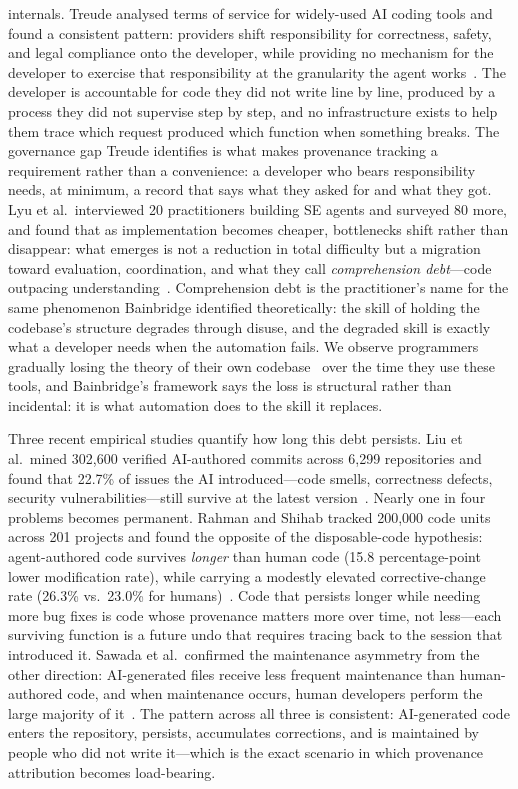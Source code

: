 internals.
Treude analysed terms of service for widely-used AI coding tools and found a
consistent pattern: providers shift responsibility for correctness, safety, and
legal compliance onto the developer, while providing no mechanism for the
developer to exercise that responsibility at the granularity the agent
works~\cite{treude2026accountable}. The developer is accountable for code they
did not write line by line, produced by a process they did not supervise step by
step, and no infrastructure exists to help them trace which request produced which
function when something breaks. The governance gap Treude identifies is what makes
provenance tracking a requirement rather than a convenience: a developer who bears
responsibility needs, at minimum, a record that says what they asked for and what
they got.
Lyu et al.\ interviewed 20 practitioners building SE agents and surveyed 80 more,
and found that as implementation becomes cheaper, bottlenecks shift rather than
disappear: what emerges is not a reduction in total difficulty but a migration
toward evaluation, coordination, and what they call \emph{comprehension
debt}---code outpacing understanding~\cite{lyu2026practitioners}. Comprehension
debt is the practitioner's name for the same phenomenon Bainbridge identified
theoretically: the skill of holding the codebase's structure degrades through
disuse, and the degraded skill is exactly what a developer needs when the
automation fails. We observe programmers gradually losing the theory of
their own codebase~\cite{naur1985} over the time they use these tools, and
Bainbridge's framework says the loss is structural rather than incidental: it is
what automation does to the skill it replaces.

Three recent empirical studies quantify how long this debt persists. Liu et al.\
mined 302{,}600 verified AI-authored commits across 6{,}299 repositories and found
that 22.7\% of issues the AI introduced---code smells, correctness defects, security
vulnerabilities---still survive at the latest version~\cite{liu2026debt}. Nearly one
in four problems becomes permanent. Rahman and Shihab tracked 200{,}000 code units
across 201 projects and found the opposite of the disposable-code hypothesis: agent-authored
code survives \emph{longer} than human code (15.8 percentage-point lower modification rate),
while carrying a modestly elevated corrective-change rate (26.3\% vs.\ 23.0\% for
humans)~\cite{rahman2026survive}. Code that persists longer while needing more bug fixes
is code whose provenance matters more over time, not less---each surviving function is a
future undo that requires tracing back to the session that introduced it. Sawada et al.\
confirmed the maintenance asymmetry from the other direction: AI-generated files receive
less frequent maintenance than human-authored code, and when maintenance occurs, human
developers perform the large majority of it~\cite{sawada2026maintenance}. The pattern
across all three is consistent: AI-generated code enters the repository, persists, accumulates
corrections, and is maintained by people who did not write it---which is the exact scenario
in which provenance attribution becomes load-bearing.

